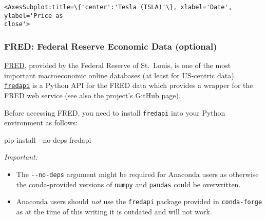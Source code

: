 \documentclass{scrartcl}
\makeatletter
\providecommand{\tightlist}{%
      \setlength{\itemsep}{0pt}\setlength{\parskip}{0pt}}
\newenvironment{Shaded}{}{}
\newcommand{\NormalTok}[1]{{#1}}
\newcommand{\ExtensionTok}[1]{{#1}}
\newcommand{\boxspacing}{\kern\kvtcb@left@rule\kern\kvtcb@boxsep}
\newcommand{\prompt}[4]{
        {\ttfamily\llap{{\color{#2}[#3]:\hspace{3pt}#4}}\vspace{-\baselineskip}}
    }
\makeatother
\begin{document}
            \begin{tcolorbox}[breakable, size=fbox, boxrule=.5pt, pad at break*=1mm, opacityfill=0]
\prompt{Out}{outcolor}{21}{\boxspacing}
\begin{Verbatim}[commandchars=\\\{\}]
<AxesSubplot:title=\{'center':'Tesla (TSLA)'\}, xlabel='Date', ylabel='Price as
close'>
\end{Verbatim}
\end{tcolorbox}
        
    \begin{center}
    \end{center}
    

\hypertarget{fred-federal-reserve-economic-data-optional}{%
\subsubsection{FRED: Federal Reserve Economic Data
(optional)}\label{fred-federal-reserve-economic-data-optional}}

\href{https://fred.stlouisfed.org/}{FRED}, provided by the Federal
Reserve of St.~Louis, is one of the most important macroeconomic online
databases (at least for US-centric data).
\href{https://pypi.org/project/fredapi/}{\texttt{fredapi}} is a Python
API for the FRED data which provides a wrapper for the FRED web service
(see also the project's \href{https://github.com/mortada/fredapi}{GitHub
page}).

Before accessing FRED, you need to install \texttt{fredapi} into your
Python environment as follows:

\begin{Shaded}
\begin{Highlighting}[]
\ExtensionTok{pip}\NormalTok{ install {-}{-}no{-}deps fredapi}
\end{Highlighting}
\end{Shaded}

\emph{Important:}

\begin{itemize}
\tightlist
\item
  The \texttt{-\/-no-deps} argument might be required for Anaconda users
  as otherwise the conda-provided versions of \texttt{numpy} and
  \texttt{pandas} could be overwritten.
\item
  Anaconda users should \emph{not} use the \texttt{fredapi} package
  provided in \texttt{conda-forge} as at the time of this writing it is
  outdated and will not work.
\end{itemize}
\end{document}
